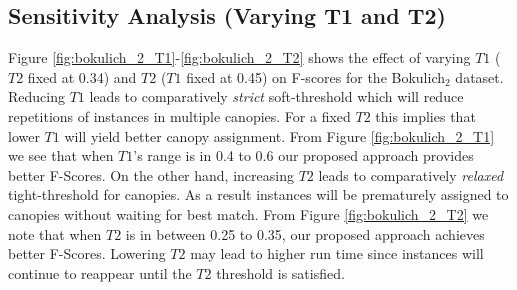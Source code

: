 \documentclass[10pt, conference, compsocconf]{IEEEtran}
\begin{document}
 

\subsection{\textbf{Sensitivity Analysis (Varying T1 and T2)}}
Figure \ref{fig:bokulich_2_T1}-\ref{fig:bokulich_2_T2} shows the 
effect of varying $T1$ ($T2$ fixed at 0.34) and $T2$ ($T1$ fixed at 0.45) on F-scores for the Bokulich$_2$ dataset. Reducing $T1$ leads to
comparatively \textit{strict} soft-threshold which will reduce 
repetitions of instances in multiple canopies. For a fixed $T2$ this implies that 
lower $T1$ will yield better canopy assignment. From Figure \ref{fig:bokulich_2_T1} we see that 
when $T1$'s range is in 0.4 to 0.6 our proposed approach provides better 
F-Scores. On the other hand, increasing $T2$ leads to comparatively \textit{relaxed} tight-threshold for canopies. As a result instances will be prematurely assigned to canopies without waiting for best match. From Figure \ref{fig:bokulich_2_T2} we note that 
when $T2$  is in between 0.25 to 0.35, 
our proposed approach achieves better F-Scores. Lowering 
$T2$ may lead to higher run time since instances will continue to reappear 
until the $T2$ threshold is satisfied.                   
\end{document}
